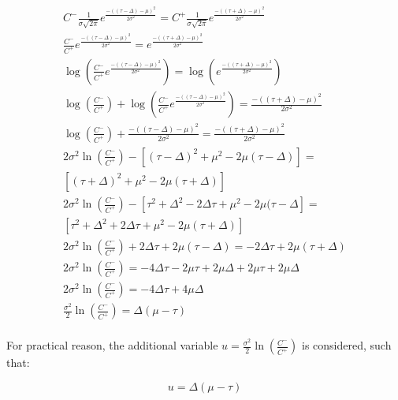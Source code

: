 \begin{equation}
    \begin{split}
        C^{-}\frac{1}{\sigma\sqrt{2\pi}}e^{\frac{-((\tau-\Delta)-\mu)^2}{2\sigma^2}}=
        C^{+}\frac{1}{\sigma\sqrt{2\pi}}e^{\frac{-((\tau+\Delta)-\mu)^2}{2\sigma^2}}\\
        \frac{C^{-}}{C^{+}}e^{\frac{-((\tau-\Delta)-\mu)^2}{2\sigma^2}}=e^{\frac{-((\tau+\Delta)-\mu)^2}{2\sigma^2}}\\
        \log{\left(\frac{C^{-}}{C^{+}}e^{\frac{-((\tau-\Delta)-\mu)^2}{2\sigma^2}}\right)}=\log{\left(e^{\frac{-((\tau+\Delta)-\mu)^2}{2\sigma^2}}\right)}\\
        \log{\left( \frac{C^-}{C^+} \right)} + \log{\left(\frac{C^{-}}{C^{+}}e^{\frac{-((\tau-\Delta)-\mu)^2}{2\sigma^2}}\right)} = \frac{-((\tau + \Delta)-\mu)^2}{2\sigma^2}\\
        \log{\left( \frac{C^-}{C^+} \right)} + \frac{-((\tau - \Delta)-\mu)^2}{2\sigma^2} = \frac{-((\tau + \Delta)-\mu)^2}{2\sigma^2}\\
        2\sigma^2\ln{\left(\frac{C^-}{C^+}\right)} - \left[(\tau - \Delta)^2 + \mu^2 -2\mu(\tau - \Delta)\right] = \\ \left[(\tau + \Delta)^2 + \mu^2 -2\mu(\tau + \Delta)\right]\\
        2\sigma^2\ln{\left(\frac{C^-}{C^+}\right)} - \left[ \tau^2 + \Delta^2 - 2\Delta\tau + \mu^2 -2\mu(\tau - \Delta \right] = \\ \left[ \tau^2 + \Delta^2 + 2\Delta\tau + \mu^2 -2\mu(\tau + \Delta)\right]\\
         2\sigma^2\ln{\left(\frac{C^-}{C^+}\right)} + 2\Delta\tau + 2\mu(\tau - \Delta) = -2\Delta\tau + 2\mu(\tau + \Delta)\\
          2\sigma^2\ln{\left(\frac{C^-}{C^+}\right)} = -4\Delta\tau - 2\mu\tau + 2\mu\Delta + 2\mu\tau + 2\mu\Delta\\
          2\sigma^2\ln{\left(\frac{C^-}{C^+}\right)} = -4\Delta\tau + 4\mu\Delta\\
          \frac{\sigma^2}{2}\ln{\left(\frac{C^-}{C^+}\right)} = \Delta(\mu-\tau)\\
    \end{split}
\end{equation}

For practical reason, the additional variable $u=\frac{\sigma^2}{2}\ln{\left(\frac{C^-}{C^+}\right)}$ is considered, such that:

\begin{equation}
    u=\Delta(\mu-\tau)
    \label{eqTWu}
\end{equation}

